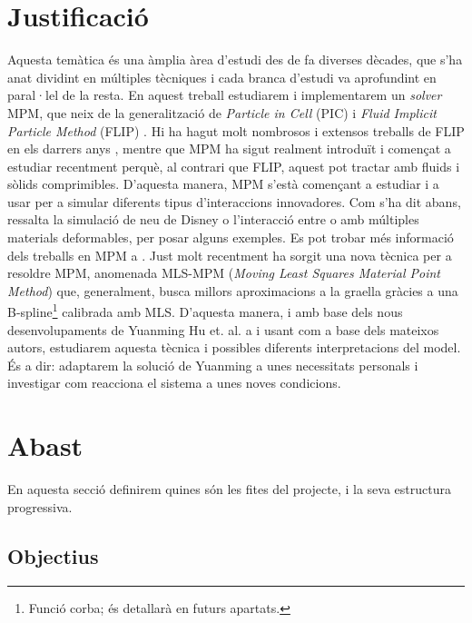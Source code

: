 \documentclass[a4paper]{report}
\begin{document}
	\section{Justificació}
	Aquesta temàtica és una àmplia àrea d'estudi des de fa diverses dècades, que s'ha anat dividint en múltiples tècniques i cada branca d'estudi va aprofundint en paral·lel de la resta.
	\newline
	En aquest treball estudiarem i implementarem un \textit{solver} MPM, que neix de la generalització de \textit{Particle in Cell} (PIC) i \textit{Fluid Implicit Particle Method} (FLIP) \cite{Sulsky1995}. Hi ha hagut molt nombrosos i extensos treballs de FLIP en els darrers anys \cite{Bridson2018,Zhu2005}, mentre que MPM ha sigut realment introduït i començat a estudiar recentment perquè, al contrari que FLIP, aquest pot tractar amb fluids i sòlids comprimibles.
	\newline
	D'aquesta manera, MPM s'està començant a estudiar i a usar per a simular diferents tipus d'interaccions innovadores. Com s'ha dit abans, ressalta la simulació de neu de Disney \cite{Stomakhin} o l'interacció entre o amb múltiples materials deformables\cite{Hegemann2013}, per posar alguns exemples. Es pot trobar més informació dels treballs en MPM a \cite{Jiang2016}.
	\newline
	Just molt recentment ha sorgit una nova tècnica per a resoldre MPM, anomenada MLS-MPM (\textit{Moving Least Squares Material Point Method})\cite{hu2018mlsmpmcpic} que, generalment, busca millors aproximacions a la graella gràcies a una B-spline\footnote{Funció corba; és detallarà en futurs apartats.} calibrada amb MLS.
	\newline
	D'aquesta manera, i amb base dels nous desenvolupaments de Yuanming Hu et. al. a \cite{hu2018mlsmpmcpic} i usant com a base \cite{Hu} dels mateixos autors, estudiarem aquesta tècnica i possibles diferents interpretacions del model. És a dir: adaptarem la solució de Yuanming a unes necessitats personals i investigar com reacciona el sistema a unes noves condicions.
	
	\section{Abast}
	En aquesta secció definirem quines són les fites del projecte, i la seva estructura progressiva.
	\subsection{Objectius}
\end{document}
